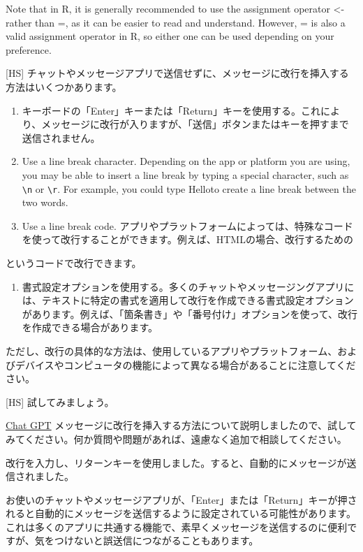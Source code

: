 \documentclass[
]{book}
\providecommand{\tightlist}{%
  \setlength{\itemsep}{0pt}\setlength{\parskip}{0pt}}
\theoremstyle{definition}
\theoremstyle{definition}
\theoremstyle{definition}
\theoremstyle{definition}
\theoremstyle{remark}
\begin{document}
Note that in R, it is generally recommended to use the assignment operator \textless- rather than =, as it can be easier to read and understand. However, = is also a valid assignment operator in R, so either one can be used depending on your preference.

{[}HS{]} チャットやメッセージアプリで送信せずに、メッセージに改行を挿入する方法はいくつかあります。

\begin{enumerate}
\def\labelenumi{\arabic{enumi}.}
\item
  キーボードの「Enter」キーまたは「Return」キーを使用する。これにより、メッセージに改行が入りますが、「送信」ボタンまたはキーを押すまで送信されません。
\item
  Use a line break character. Depending on the app or platform you are using, you may be able to insert a line break by typing a special character, such as \texttt{\textbackslash{}n} or \texttt{\textbackslash{}r}. For example, you could type Hello\nWorld to create a line break between the two words.
\item
  Use a line break code. アプリやプラットフォームによっては、特殊なコードを使って改行することができます。例えば、HTMLの場合、改行するための
\end{enumerate}

というコードで改行できます。

\begin{enumerate}
\def\labelenumi{\arabic{enumi}.}
\setcounter{enumi}{3}
\tightlist
\item
  書式設定オプションを使用する。多くのチャットやメッセージングアプリには、テキストに特定の書式を適用して改行を作成できる書式設定オプションがあります。例えば、「箇条書き」や「番号付け」オプションを使って、改行を作成できる場合があります。
\end{enumerate}

ただし、改行の具体的な方法は、使用しているアプリやプラットフォーム、およびデバイスやコンピュータの機能によって異なる場合があることに注意してください。

{[}HS{]} 試してみましょう。

\protect\hyperlink{chatgpt}{Chat GPT} メッセージに改行を挿入する方法について説明しましたので、試してみてください。何か質問や問題があれば、遠慮なく追加で相談してください。

改行を入力し、リターンキーを使用しました。すると、自動的にメッセージが送信されました。

お使いのチャットやメッセージアプリが、「Enter」または「Return」キーが押されると自動的にメッセージを送信するように設定されている可能性があります。これは多くのアプリに共通する機能で、素早くメッセージを送信するのに便利ですが、気をつけないと誤送信につながることもあります。
\end{document}
